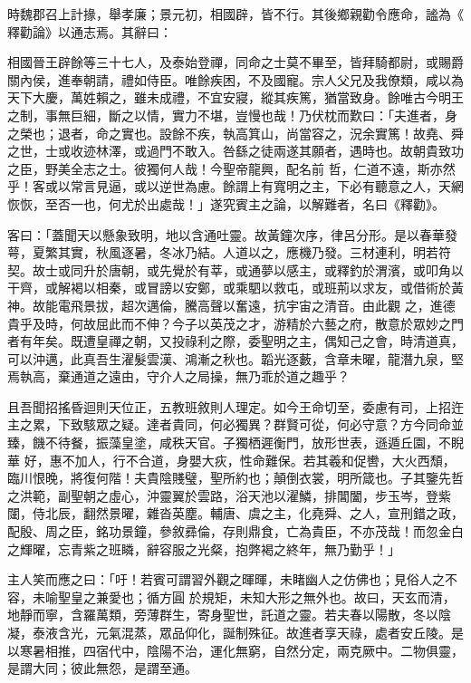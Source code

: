 \begin{pinyinscope}
 時魏郡召上計掾，舉孝廉；景元初，相國辟，皆不行。其後鄉親勸令應命，謐為《
 釋勸論》以通志焉。其辭曰：



 相國晉王辟餘等三十七人，及泰始登禪，同命之士莫不畢至，皆拜騎都尉，或賜爵關內侯，進奉朝請，禮如侍臣。唯餘疾困，不及國寵。宗人父兄及我僚類，咸以為天下大慶，萬姓賴之，雖未成禮，不宜安寢，縱其疾篤，猶當致身。餘唯古今明王之制，事無巨細，斷之以情，實力不堪，豈慢也哉！乃伏枕而歎曰：「夫進者，身之榮也；退者，命之實也。設餘不疾，執高箕山，尚當容之，況余實篤！故堯、舜之世，士或收迹林澤，或過門不敢入。咎繇之徒兩遂其願者，遇時也。故朝貴致功之臣，野美全志之士。彼獨何人哉！今聖帝龍興，配名前
 哲，仁道不遠，斯亦然乎！客或以常言見逼，或以逆世為慮。餘謂上有寬明之主，下必有聽意之人，天網恢恢，至否一也，何尤於出處哉！」遂究賓主之論，以解難者，名曰《釋勸》。



 客曰：「蓋聞天以懸象致明，地以含通吐靈。故黃鐘次序，律呂分形。是以春華發萼，夏繁其實，秋風逐暑，冬冰乃結。人道以之，應機乃發。三材連利，明若符契。故士或同升於唐朝，或先覺於有莘，或通夢以感主，或釋釣於渭濱，或叩角以干齊，或解褐以相秦，或冒謗以安鄭，或乘駟以救屯，或班荊以求友，或借術於黃神。故能電飛景拔，超次邁倫，騰高聲以奮遠，抗宇宙之清音。由此觀
 之，進德貴乎及時，何故屈此而不伸？今子以英茂之才，游精於六藝之府，散意於眾妙之門者有年矣。既遭皇禪之朝，又投祿利之際，委聖明之主，偶知己之會，時清道真，可以沖邁，此真吾生濯髮雲漢、鴻漸之秋也。韜光逐藪，含章未曜，龍潛九泉，堅焉執高，棄通道之遠由，守介人之局操，無乃乖於道之趣乎？



 且吾聞招搖昏迴則天位正，五教班敘則人理定。如今王命切至，委慮有司，上招迕主之累，下致駭眾之疑。達者貴同，何必獨異？群賢可從，何必守意？方今同命並臻，饑不待餐，振藻皇塗，咸秩天官。子獨栖遲衡門，放形世表，遜遁丘園，不睨華
 好，惠不加人，行不合道，身嬰大疢，性命難保。若其羲和促轡，大火西頹，臨川恨晚，將復何階！夫貴陰賤璧，聖所約也；顛倒衣裳，明所箴也。子其鑒先哲之洪範，副聖朝之虛心，沖靈翼於雲路，浴天池以濯鱗，排閶闔，步玉岑，登紫闥，侍北辰，翻然景曜，雜沓英塵。輔唐、虞之主，化堯舜、之人，宣刑錯之政，配殷、周之臣，銘功景鐘，參敘彞倫，存則鼎食，亡為貴臣，不亦茂哉！而忽金白之輝曜，忘青紫之班瞵，辭容服之光粲，抱弊褐之終年，無乃勤乎！」



 主人笑而應之曰：「吁！若賓可謂習外觀之暉暉，未睹幽人之仿佛也；見俗人之不容，未喻聖皇之兼愛也；循方圓
 於規矩，未知大形之無外也。故曰，天玄而清，地靜而寧，含羅萬類，旁薄群生，寄身聖世，託道之靈。若夫春以陽散，冬以陰凝，泰液含光，元氣混蒸，眾品仰化，誕制殊征。故進者享天祿，處者安丘陵。是以寒暑相推，四宿代中，陰陽不治，運化無窮，自然分定，兩克厥中。二物俱靈，是謂大同；彼此無怨，是謂至通。




\end{pinyinscope}
